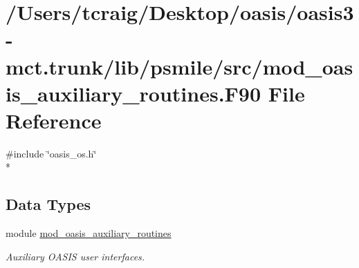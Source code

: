 \hypertarget{mod__oasis__auxiliary__routines_8_f90}{\section{/\+Users/tcraig/\+Desktop/oasis/oasis3-\/mct.trunk/lib/psmile/src/mod\+\_\+oasis\+\_\+auxiliary\+\_\+routines.F90 File Reference}
\label{mod__oasis__auxiliary__routines_8_f90}
}
{\ttfamily \#include \char`\"{}oasis\+\_\+os.\+h\char`\"{}}\\*
\subsection*{Data Types}
\begin{DoxyCompactItemize}
\item 
module \hyperlink{classmod__oasis__auxiliary__routines}{mod\+\_\+oasis\+\_\+auxiliary\+\_\+routines}
\begin{DoxyCompactList}\small\item\em Auxiliary O\+A\+S\+I\+S user interfaces. \end{DoxyCompactList}\end{DoxyCompactItemize}

